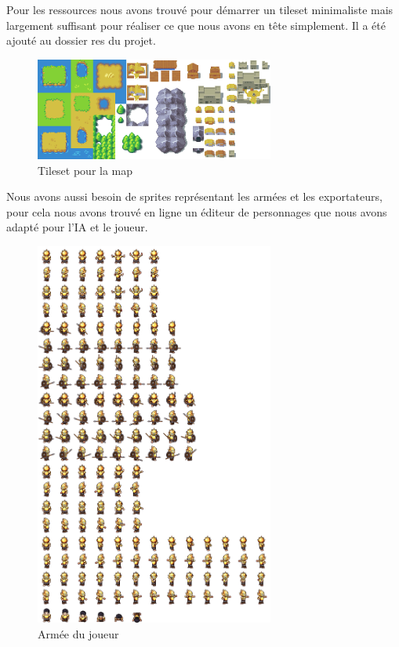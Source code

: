 \documentclass[a4paper,12pt]{article}
\begin{document}
\vspace{1\baselineskip}


Pour les ressources nous avons trouvé pour démarrer un tileset minimaliste mais largement suffisant pour réaliser ce que nous avons en tête simplement. Il a été ajouté au dossier res du projet.
\\

\begin{figure}[H]
\begin{center}
  \includegraphics[width=0.7\textwidth]{images/tileset.png}
  \caption{Tileset pour la map}
 \end{center}

\end{figure}

Nous avons aussi besoin de sprites représentant les armées et les exportateurs, pour cela nous avons trouvé en ligne un éditeur de personnages que nous avons adapté pour l'IA et le joueur.

\begin{figure}[H]
\begin{center}
  \includegraphics[width=0.7\textwidth]{images/Army_Gold.png}
  \caption{Armée du joueur}
 \end{center}
\end{figure}
\end{document}
